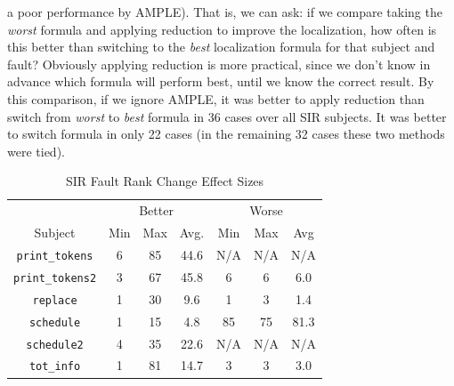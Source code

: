 a poor performance by AMPLE).  That is, we can ask: if we compare
taking the \emph{worst} formula and applying reduction to improve the
localization, how often is this better than switching to the
\emph{best} localization formula for that subject and fault?
Obviously applying reduction is more practical, since we don't know in
advance which formula will perform best, until we know the correct
result.  By this comparison, if we ignore AMPLE, it was better to
apply reduction than switch from \emph{worst} to \emph{best} formula
in 36 cases over all SIR subjects.  It was better to switch formula in
only 22 cases (in the remaining 32 cases these two methods were tied).



\begin{table}
\begin{center}
\begin{tabular}{|c||c|c|c||c|c|c|}
\hline
\hline
& \multicolumn{3}{|c|}{Better} & \multicolumn{3}{|c|}{Worse} \\
Subject & Min & Max & Avg. & Min & Max & Avg \\
\hline
\hline
{\tt print\_tokens} & 6 & 85 & 44.6 & N/A & N/A & N/A \\
\hline
{\tt print\_tokens2} & 3 & 67 & 45.8 & 6 & 6 & 6.0 \\
\hline
{\tt replace} & 1 & 30 & 9.6 & 1 & 3 & 1.4 \\
\hline
{\tt schedule} & 1 & 15 & 4.8 & 85 & 75 & 81.3 \\
\hline
{\tt schedule2} & 4 & 35 & 22.6 & N/A & N/A & N/A \\
\hline
{\tt tot\_info} & 1 & 81 & 14.7 & 3 & 3 & 3.0 \\
\hline
\hline
\end{tabular}
\end{center}
\caption{SIR Fault Rank Change Effect Sizes}
\label{tab:rankchange}
\end{table}